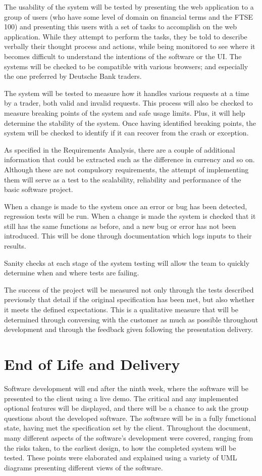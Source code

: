 \documentclass[]{IEEEtran}
\begin{document}
The usability of the system will be tested by presenting the web application to a group of users (who have some level of domain on financial terms and the FTSE 100) and presenting this users with a set of tasks to accomplish on the web application. While they attempt to perform the tasks, they be told to describe verbally their thought process and actions, while being monitored to see where it becomes difficult to understand the intentions of the software or the UI.
The systems will be checked to be compatible with various browsers; and especially the one preferred by Deutsche Bank traders.  

The system will be tested to measure how it handles various requests at a time by a trader, both valid and invalid requests. This process will also be checked to measure breaking points of the system and safe usage limits. Plus, it will help determine the stability of the system. Once having identified breaking points, the system will be checked to identify if it can recover from the crash or exception.

As specified in the Requirements Analysis, there are a couple of additional information that could be extracted such as the difference in currency and so on. Although these are not compulsory requirements, the attempt of implementing them will serve as a test to the scalability, reliability and performance of the basic software project.

When a change is made to the system once an error or bug has been detected, regression tests will be run. When a change is made the system is checked that it still has the same functions as before, and a new bug or error has not been introduced. This will be done through documentation which logs inputs to their results.

Sanity checks at each stage of the system testing will allow the team to quickly determine when and where tests are failing.

The success of the project will be measured not only through the tests described previously that detail if the original specification has been met, but also whether it meets the defined expectations. This is a qualitative measure that will be determined through conversing with the customer as much as possible throughout development and through the feedback given following the presentation delivery. 

\section{End of Life and Delivery}
	Software development will end after the ninth week, where the software will be presented to the client using a live demo. The critical and any implemented optional features will be displayed, and there will be a chance to ask the group questions about the developed software. The software will be in a fully functional state, having met the specification set by the client. Throughout the document, many different aspects of the software's development were covered, ranging from the risks taken, to the earliest design, to how the completed system will be tested. These points were elaborated and explained using a variety of UML diagrams presenting different views of the software. 
	


\end{document}
